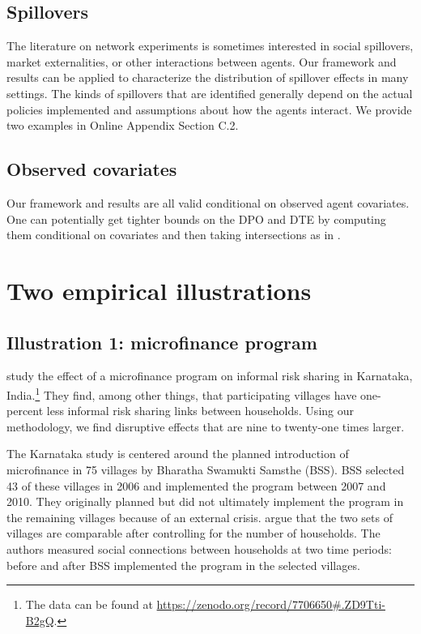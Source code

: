 \documentclass[12pt]{article}
\theoremstyle{definition}
\begin{document}
\subsection{Spillovers}
The literature on network experiments is sometimes interested in social spillovers, market externalities, or other interactions between agents. Our framework and results can be applied to characterize the distribution of spillover effects in many settings. The kinds of spillovers that are identified generally depend on the actual policies implemented and assumptions about how the agents interact. We provide two examples in Online Appendix Section C.2.  

\subsection{Observed covariates}
Our framework and results are all valid conditional on observed agent covariates. One can potentially get tighter bounds on the DPO and DTE by computing them conditional on covariates and then taking intersections as in  \cite{firpo2019partial}.  


\section{Two empirical illustrations}

\subsection{Illustration 1: microfinance program}
 \cite{banerjee2021changes} study the effect of a microfinance program on informal risk sharing in Karnataka, India.\footnote{The data can be found at \url{https://zenodo.org/record/7706650\#.ZD9Tti-B2gQ}.} They find, among other things, that participating villages have one-percent less informal risk sharing links between households.  Using our methodology, we find disruptive effects that are nine to twenty-one times larger.   

The Karnataka study is centered around the planned introduction of microfinance in 75 villages by Bharatha Swamukti Samsthe (BSS). BSS selected 43 of these villages in 2006 and implemented the program between 2007 and 2010. They originally planned but did not ultimately implement the program in the remaining villages because of an external crisis. \cite{banerjee2021changes} argue that the two sets of villages are comparable after controlling for the number of households. The authors measured social connections between households at two time periods: before and after BSS implemented the program in the selected villages.   
\end{document}
